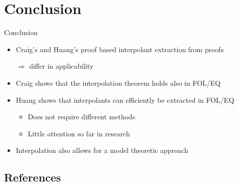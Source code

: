 \documentclass[final,compress]{beamer}
\begin{document}
\section{Conclusion}
\begin{frame}{Conclusion}
	\begin{itemize}
		\item Craig's and Huang's proof based interpolant extraction from proofs

			$\Rightarrow$ differ in applicability 

		\item Craig shows that the interpolation theorem holds also in FOL/EQ
		\item Huang shows that interpolants can efficiently be extracted in FOL/EQ

			\begin{itemize}
				\item Does not require different methods
				\item Little attention so far in research
			\end{itemize}

		\item Interpolation also allows for a model theoretic approach

	\end{itemize}
\end{frame}

\subsection{References}
\begin{frame}
	
\end{frame}
\end{document}
